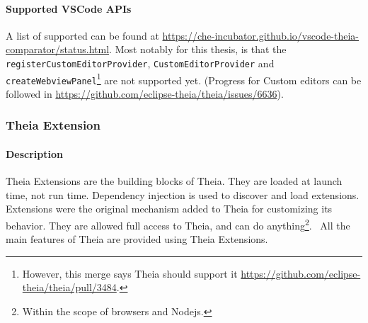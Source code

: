 \paragraph*{Supported VSCode APIs}
A list of supported  can be found at \href{https://che-incubator.github.io/vscode-theia-comparator/status.html}{https://che-incubator.github.io/vscode-theia-comparator/status.html}.
Most notably for this thesis, is that the \texttt{registerCustomEditorProvider}, \texttt{CustomEditorProvider} and \texttt{createWebviewPanel}\footnote{However, this merge says Theia should support it \href{https://github.com/eclipse-theia/theia/pull/3484}{https://github.com/eclipse-theia/theia/pull/3484}.} are not supported yet.
(Progress for Custom editors can be followed in \href{https://github.com/eclipse-theia/theia/issues/6636}{https://github.com/eclipse-theia/theia/issues/6636}).




\subsubsection{Theia Extension}

\paragraph*{Description}
\Gls{Theia} Extensions are the building blocks of Theia.
They are loaded at launch time, not run time.
Dependency injection is used to discover and load extensions.
Extensions were the original mechanism added to Theia for customizing its behavior.
They are allowed full access to Theia, and can do anything\footnote{Within the scope of browsers and \gls{Nodejs}.}.~\cite{helmingEclipseTheiaExtensions2019,helmingEclipseTheiaIDE2019a}
All the main features of Theia are provided using Theia Extensions.



